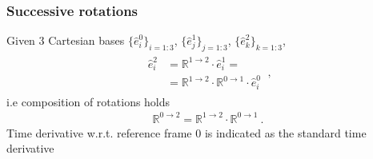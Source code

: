 \documentclass[letterpaper,10pt,english]{jupyterBook}
\begin{document}
\subsubsection{Successive rotations}
\label{\detokenize{ch/kinematics-rotations-tensors:successive-rotations}}
\sphinxAtStartPar
{} Given 3 Cartesian bases \(\{ \hat{e}^0_i \}_{i=1:3}\), \(\{ \hat{e}^1_j \}_{j=1:3}\), \(\{ \hat{e}^2_k \}_{k=1:3}\),
\begin{equation*}
\begin{split}\begin{aligned}
 \hat{e}^2_i 
  & = \mathbb{R}^{1 \rightarrow 2} \cdot \hat{e}^1_i = \\ 
  & = \mathbb{R}^{1 \rightarrow 2} \cdot \mathbb{R}^{0 \rightarrow 1} \cdot\hat{e}^0_i 
\end{aligned} \ , \end{split}
\end{equation*}
\sphinxAtStartPar
i.e composition of rotations holds
\begin{equation*}
\begin{split}\mathbb{R}^{0 \rightarrow 2} = \mathbb{R}^{1 \rightarrow 2} \cdot \mathbb{R}^{0 \rightarrow 1} \ .\end{split}
\end{equation*}
\sphinxAtStartPar
{} Time derivative w.r.t. reference frame 0 is indicated as the standard time derivative
\end{document}
